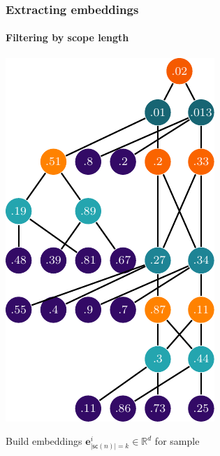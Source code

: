 \documentclass[10pt, t, xcolor={usenames,dvipsnames,svgnames}, compress]{beamer}
\begin{document}
\begin{frame}
\begin{minipage}[t]{0.55\linewidth}
  \end{minipage}
\end{frame}

\begin{frame}
  \frametitle{Extracting embeddings}
  \framesubtitle{Filtering by scope length}
  \begin{minipage}{0.4\linewidth}
    \begin{center}
      \includegraphics[width=.86\columnwidth]{figures/spn-emb-eval}
    \end{center}
  \end{minipage}\hfill\begin{minipage}[t]{0.55\linewidth}
    \vspace{-80pt}
    Build embeddings $\mathbf{e}^{i}_{|\mathsf{sc}(n)|=k}\in \mathbb{R}^{d}$ for sample

\end{minipage}
\end{frame}
\end{document}

